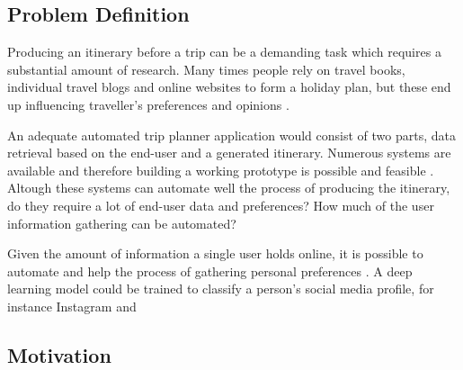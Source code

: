 \subsection{Problem Definition}

        Producing an itinerary before a trip can be a demanding task
        which requires  a substantial amount of  research. Many times
        people rely on travel books, individual travel blogs and online
        websites to form a holiday plan, but these end up influencing 
        traveller’s preferences and opinions \cite{DeChoudhury2010}. 

        An adequate automated trip planner application would consist
        of two parts, data retrieval based on the end-user and a
        generated itinerary. Numerous systems are available and 
        therefore building a working prototype is possible and feasible 
        \cite{Sylejmani2017,Tumas2009, Vansteenwegen2011,Kurata2013,
        RamalhoBrilhante2014, DeChoudhury2010,DUNSTALL2008a, 
        DiBitonto2010a,Gavalas}. Altough these systems can automate well the
        process of producing the itinerary, do they require a lot of 
        end-user data and preferences? How much of the user information
        gathering can be automated?

        Given the amount of information a single user holds online, 
        it is possible to automate and help the process of 
        gathering personal preferences \cite{Buraya2017}. A deep 
        learning model could be trained to classify a person's social
        media profile, for instance Instagram and 

\subsection{Motivation}